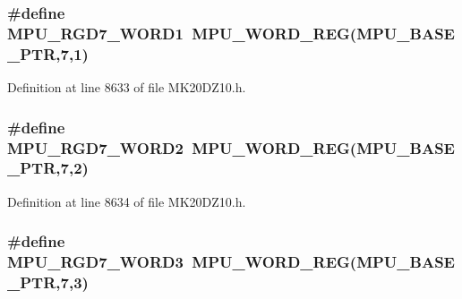 \subsubsection[{\texorpdfstring{M\+P\+U\+\_\+\+R\+G\+D7\+\_\+\+W\+O\+R\+D1}{MPU_RGD7_WORD1}}]{\setlength{\rightskip}{0pt plus 5cm}\#define M\+P\+U\+\_\+\+R\+G\+D7\+\_\+\+W\+O\+R\+D1~{\bf M\+P\+U\+\_\+\+W\+O\+R\+D\+\_\+\+R\+EG}({\bf M\+P\+U\+\_\+\+B\+A\+S\+E\+\_\+\+P\+TR},7,1)}\hypertarget{group___m_p_u___register___accessor___macros_ga6859cb5a282a17348e973197e8c1c62c}{}\label{group___m_p_u___register___accessor___macros_ga6859cb5a282a17348e973197e8c1c62c}


Definition at line 8633 of file M\+K20\+D\+Z10.\+h.

\subsubsection[{\texorpdfstring{M\+P\+U\+\_\+\+R\+G\+D7\+\_\+\+W\+O\+R\+D2}{MPU_RGD7_WORD2}}]{\setlength{\rightskip}{0pt plus 5cm}\#define M\+P\+U\+\_\+\+R\+G\+D7\+\_\+\+W\+O\+R\+D2~{\bf M\+P\+U\+\_\+\+W\+O\+R\+D\+\_\+\+R\+EG}({\bf M\+P\+U\+\_\+\+B\+A\+S\+E\+\_\+\+P\+TR},7,2)}\hypertarget{group___m_p_u___register___accessor___macros_gab4ff2e389ffa299dde54ae725538f47e}{}\label{group___m_p_u___register___accessor___macros_gab4ff2e389ffa299dde54ae725538f47e}


Definition at line 8634 of file M\+K20\+D\+Z10.\+h.

\subsubsection[{\texorpdfstring{M\+P\+U\+\_\+\+R\+G\+D7\+\_\+\+W\+O\+R\+D3}{MPU_RGD7_WORD3}}]{\setlength{\rightskip}{0pt plus 5cm}\#define M\+P\+U\+\_\+\+R\+G\+D7\+\_\+\+W\+O\+R\+D3~{\bf M\+P\+U\+\_\+\+W\+O\+R\+D\+\_\+\+R\+EG}({\bf M\+P\+U\+\_\+\+B\+A\+S\+E\+\_\+\+P\+TR},7,3)}\hypertarget{group___m_p_u___register___accessor___macros_ga108666443b99fa2a3f1baac629933c92}{}\label{group___m_p_u___register___accessor___macros_ga108666443b99fa2a3f1baac629933c92}


